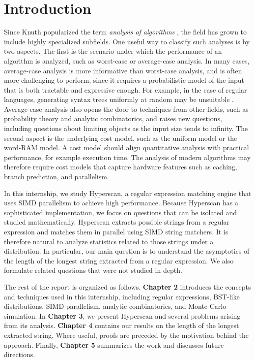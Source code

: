 \chapter{Introduction}

Since Knuth popularized the term \textit{analysis of algorithms} \cite[Preface]{knuth1997art}, the field has grown to include highly specialized subfields. One useful way to classify such analyses is by two aspects. The first is the scenario under which the performance of an algorithm is analyzed, such as worst-case or average-case analysis. In many cases, average-case analysis is more informative than worst-case analysis, and is often more challenging to perform, since it requires a probabilistic model of the input that is both tractable and expressive enough. For example, in the case of regular languages, generating syntax trees uniformly at random may be unsuitable \cite{koechlin2019uniform}. Average-case analysis also opens the door to techniques from other fields, such as probability theory and analytic combinatorics, and raises new questions, including questions about limiting objects as the input size tends to infinity. The second aspect is the underlying cost model, such as the uniform model or the word-RAM model. A cost model should align quantitative analysis with practical performance, for example execution time. The analysis of modern algorithms may therefore require cost models that capture hardware features such as caching, branch prediction, and parallelism.

In this internship, we study Hyperscan, a regular expression matching engine that uses SIMD parallelism to achieve high performance. Because Hyperscan has a sophisticated implementation, we focus on questions that can be isolated and studied mathematically. Hyperscan extracts possible strings from a regular expression and matches them in parallel using SIMD string matchers. It is therefore natural to analyze statistics related to those strings under a distribution. In particular, our main question is to understand the asymptotics of the length of the longest string extracted from a regular expression. We also formulate related questions that were not studied in depth.

The rest of the report is organized as follows. \textbf{Chapter 2} introduces the concepts and techniques used in this internship, including regular expressions, BST-like distributions, SIMD parallelism, analytic combinatorics, and Monte Carlo simulation. In \textbf{Chapter 3}, we present Hyperscan and several problems arising from its analysis. \textbf{Chapter 4} contains our results on the length of the longest extracted string. Where useful, proofs are preceded by the motivation behind the approach. Finally, \textbf{Chapter 5} summarizes the work and discusses future directions.
